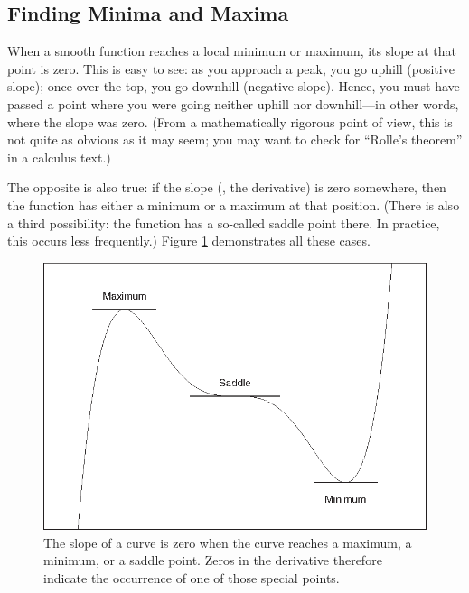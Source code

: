 

\subsection{Finding Minima and Maxima}


When a smooth function reaches a local minimum or maximum, its slope
at that point is zero. This is easy to see: as you approach a peak,
you go uphill (positive slope); once over the top, you go downhill
(negative slope). Hence, you must have passed a point where you were
going neither uphill nor downhill---in other words, where the slope
was zero. (From a mathematically rigorous point of view, this is not
quite as obvious as it may seem; you may want to check for ``Rolle's
theorem'' in a calculus text.)

The opposite is also true: if the slope (\ie, the derivative) is zero
somewhere, then the function has either a minimum or a maximum at that
position. (There is also a third possibility: the function has a
so-called saddle point there. In practice, this occurs less
frequently.) Figure \ref{fig:minmaxsaddle} demonstrates all these
cases.

\begin{figure}
  \centerline{\includegraphics{img/minmaxsaddle}}
  \caption{The slope of a curve is zero when the curve reaches a
    maximum, a minimum, or a saddle point. Zeros in the derivative
    therefore indicate the occurrence of one of those special points.}
  \label{fig:minmaxsaddle}\vspace*{-9pt}
\end{figure} 

